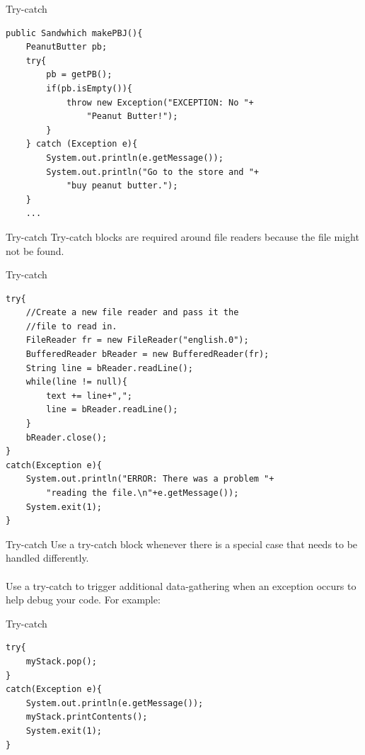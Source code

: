 \documentclass{beamer}
\begin{document}
\begin{frame}[fragile]{ Try-catch}
\begin{lstlisting}
public Sandwhich makePBJ(){
    PeanutButter pb;
    try{
        pb = getPB();
        if(pb.isEmpty()){
            throw new Exception("EXCEPTION: No "+
                "Peanut Butter!");
        }
    } catch (Exception e){
        System.out.println(e.getMessage());
        System.out.println("Go to the store and "+
            "buy peanut butter.");
    }
    ...
\end{lstlisting}
\end{frame}



\begin{frame}[fragile]{ Try-catch}
Try-catch blocks are required around file readers because the file might not be found.
\end{frame}


\begin{frame}[fragile]{ Try-catch}
\begin{lstlisting}
try{
    //Create a new file reader and pass it the
    //file to read in.
    FileReader fr = new FileReader("english.0");
    BufferedReader bReader = new BufferedReader(fr);
    String line = bReader.readLine();
    while(line != null){
        text += line+",";
        line = bReader.readLine();
    }
    bReader.close();
}
catch(Exception e){
    System.out.println("ERROR: There was a problem "+
        "reading the file.\n"+e.getMessage());
    System.exit(1);
}
\end{lstlisting}
\end{frame}


\begin{frame}[fragile]{ Try-catch}
Use a try-catch block whenever there is a special case that needs to be handled differently.\\ \ \\

Use a try-catch to trigger additional data-gathering when an exception occurs to help debug your code. For example:
\end{frame}


\begin{frame}[fragile]{ Try-catch}
\begin{lstlisting}
try{
    myStack.pop();
}
catch(Exception e){
    System.out.println(e.getMessage());
    myStack.printContents();
    System.exit(1);
}
\end{lstlisting}
\end{frame}
\end{document}
